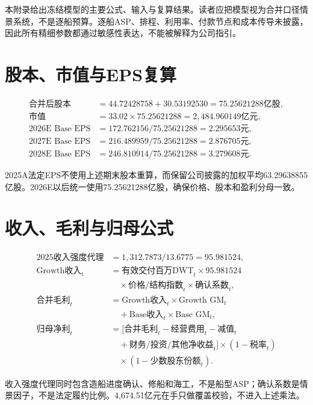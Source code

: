 本附录给出冻结模型的主要公式、输入与复算结果。读者应把模型视为合并口径情景系统，不是逐船预算。逐船ASP、排程、利用率、付款节点和成本传导未披露，因此所有精细参数都通过敏感性表达，不能被解释为公司指引。

\section{股本、市值与EPS复算}

\begin{align*}
\text{合并后股本}&=44.72428758+30.53192530=75.25621288\text{亿股},\\
\text{市值}&=33.02\times75.25621288=2,484.960149\text{亿元},\\
\text{2026E Base EPS}&=172.762156/75.25621288=2.295653\text{元},\\
\text{2027E Base EPS}&=216.489959/75.25621288=2.876705\text{元},\\
\text{2028E Base EPS}&=246.810914/75.25621288=3.279608\text{元}.
\end{align*}

2025A法定EPS不使用上述期末股本重算，而保留公司披露的加权平均63.29638855亿股。2026E以后统一使用75.25621288亿股，确保价格、股本和盈利分母一致。

\section{收入、毛利与归母公式}

\begin{align*}
\text{2025收入强度代理}&=1,312.7873/13.6775=95.981524,\\
\text{Growth收入}_{t}&=\text{有效交付百万DWT}_{t}\times95.981524\\
&\quad\times\text{价格/结构指数}_{t}\times\text{确认系数}_{t},\\
\text{合并毛利}_{t}&=\text{Growth收入}_{t}\times\text{Growth GM}_{t}\\
&\quad+\text{Base收入}_{t}\times\text{Base GM}_{t},\\
\text{归母净利}_{t}&=[\text{合并毛利}_{t}-\text{经营费用}_{t}-\text{减值}_{t}\\
&\quad+\text{财务/投资/其他净收益}_{t}]\times(1-\text{税率}_{t})\\
&\quad\times(1-\text{少数股东份额}_{t}).
\end{align*}

收入强度代理同时包含造船进度确认、修船和海工，不是船型ASP；确认系数是情景因子，不是法定履约比例。4,674.51亿元在手只做覆盖校验，不进入上述乘法。

